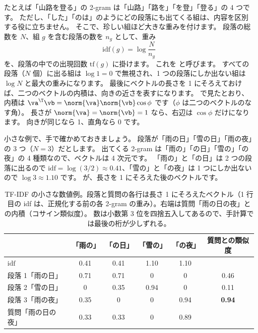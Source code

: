 たとえば「山路を登る」の 2-gram は「山路」「路を」「を登」「登る」の 4 つです。
ただし、「した」「のは」のようにどの段落にも出てくる組は、内容を区別する役に立ちません。
そこで、珍しい組ほど大きな重みを付けます。
段落の総数を $N$、組 $g$ を含む段落の数を $n_g$ として、重み
\begin{equation}
\mathrm{idf}(g) = \log\frac{N}{n_g}
\label{eq:agent-idf}
\end{equation}
を、段落の中での出現回数 $\mathrm{tf}(g)$ に掛けます。
これを と呼びます。
すべての段落（$N$ 個）に出る組は $\log 1 = 0$ で無視され、1 つの段落にしか出ない組は $\log N$ と最大の重みになります。
最後にベクトルの長さを 1 にそろえておけば、二つのベクトルの内積は、向きの近さを表すになります。
で見たとおり、内積は $\va^\T\vb=\norm{\va}\norm{\vb}\cos\phi$ です（$\phi$ は二つのベクトルのなす角）。
長さが $\norm{\va}=\norm{\vb}=1$ なら、右辺は $\cos\phi$ だけになります。
向きが同じなら 1、直角なら 0 です。

小さな例で、手で確かめておきましょう。
段落が「雨の日」「雪の日」「雨の夜」の 3 つ（$N=3$）だとします。
出てくる 2-gram は「雨の」「の日」「雪の」「の夜」の 4 種類なので、ベクトルは 4 次元です。
「雨の」と「の日」は 2 つの段落に出るので $\mathrm{idf}=\log(3/2)\approx0.41$、「雪の」と「の夜」は 1 つにしか出ないので $\log 3\approx1.10$ です。
が、長さを 1 にそろえた後のベクトルです。

\begin{table}[tbp]
\centering
\caption{TF-IDF の小さな数値例。段落と質問の各行は長さ 1 にそろえたベクトル（1 行目の idf は、正規化する前の各 2-gram の重み）。右端は質問「雨の日の夜」との内積（コサイン類似度）。
数は小数第 3 位を四捨五入してあるので、手計算では最後の桁が少しずれる。}
\label{tab:agent-tfidf-toy}
\small
\begin{tabular}{lccccc}
\toprule
 & 「雨の」 & 「の日」 & 「雪の」 & 「の夜」 & 質問との類似度 \\
\midrule
$\mathrm{idf}$ & 0.41 & 0.41 & 1.10 & 1.10 & \\
\midrule
段落 1「雨の日」 & 0.71 & 0.71 & 0 & 0 & 0.46 \\
段落 2「雪の日」 & 0 & 0.35 & 0.94 & 0 & 0.11 \\
段落 3「雨の夜」 & 0.35 & 0 & 0 & 0.94 & \textbf{0.94} \\
\midrule
質問「雨の日の夜」 & 0.33 & 0.33 & 0 & 0.89 & \\
\bottomrule
\end{tabular}
\end{table}

